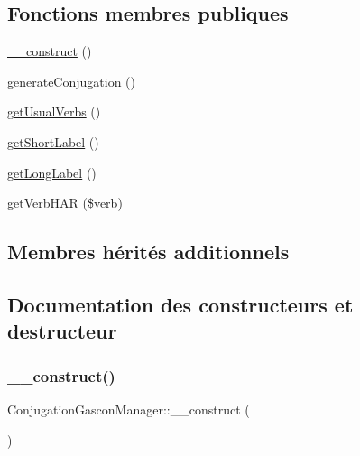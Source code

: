 \subsection*{Fonctions membres publiques}
\begin{DoxyCompactItemize}
\item 
\hyperlink{class_conjugation_gascon_manager_a2973c4bb0322f615e046f916eea48c3a}{\+\_\+\+\_\+construct} ()
\item 
\hyperlink{class_conjugation_gascon_manager_a2730ac29ac0ba6fd56c5896cefa297ac}{generate\+Conjugation} ()
\item 
\hyperlink{class_conjugation_gascon_manager_a4117ecff48a5baa29d894f6174d88983}{get\+Usual\+Verbs} ()
\item 
\hyperlink{class_conjugation_gascon_manager_a958775fb06109e0cea145f53308482b2}{get\+Short\+Label} ()
\item 
\hyperlink{class_conjugation_gascon_manager_a5fc41ec1f99e255a8c57c7b7f382bc95}{get\+Long\+Label} ()
\item 
\hyperlink{class_conjugation_gascon_manager_a1a76a0fddebe5b28b70b532d28b0de2d}{get\+Verb\+H\+AR} (\$\hyperlink{teibase_8php_aa8d8fadfcf4239c7aa288414da9d0ace}{verb})
\end{DoxyCompactItemize}
\subsection*{Membres hérités additionnels}


\subsection{Documentation des constructeurs et destructeur}
\hypertarget{class_conjugation_gascon_manager_a2973c4bb0322f615e046f916eea48c3a}{}\label{class_conjugation_gascon_manager_a2973c4bb0322f615e046f916eea48c3a} 
\subsubsection{\texorpdfstring{\+\_\+\+\_\+construct()}{\_\_construct()}}
{\footnotesize\ttfamily Conjugation\+Gascon\+Manager\+::\+\_\+\+\_\+construct (\begin{DoxyParamCaption}{ }\end{DoxyParamCaption})}



